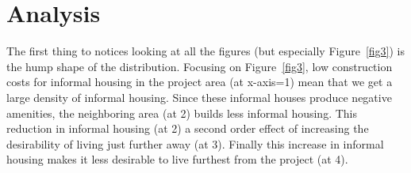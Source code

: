 \documentclass[12pt]{article}
\begin{document}
\section{Analysis}

The first thing to notices looking at all the figures (but especially Figure~\ref{fig3}) is the hump shape of the distribution.  Focusing on Figure~\ref{fig3}, low construction costs for informal housing in the project area (at x-axis=1) mean that we get a large density of informal housing.  Since these informal houses produce negative amenities, the neighboring area (at 2) builds less informal housing.  This reduction in informal housing (at 2) a second order effect of increasing the desirability of living just further away (at 3).  Finally this increase in informal housing makes it less desirable to live furthest from the project (at 4).
\end{document}
